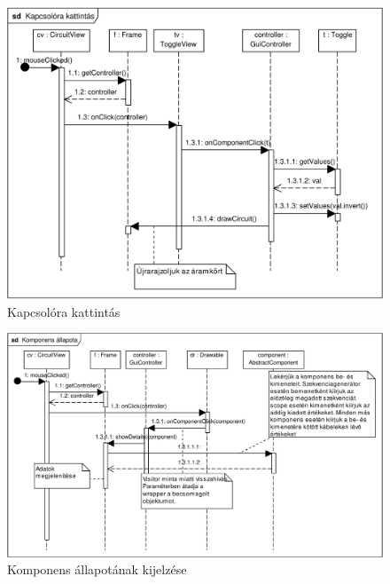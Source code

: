 \begin{figure}[H]
\begin{center}
\includegraphics[width=17cm]{chapters/chapter11/pdfs/9_toggle.pdf}
\caption{Kapcsolóra kattintás}
\label{fig:toggle}
\end{center}
\end{figure}

\begin{figure}[H]
\begin{center}
\includegraphics[width=17cm]{chapters/chapter11/pdfs/10_showcomponent.pdf}
\caption{Komponens állapotának kijelzése}
\label{fig:showcomponent}
\end{center}
\end{figure}

